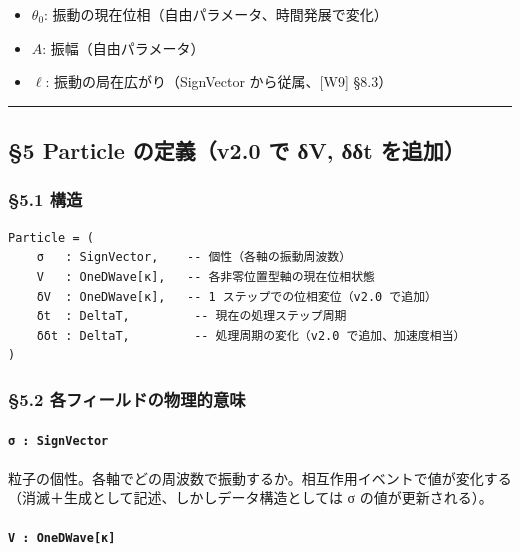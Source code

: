 \documentclass[a4paper,11pt]{ltjsarticle}
\providecommand{\tightlist}{\setlength{\itemsep}{0pt}\setlength{\parskip}{0pt}}
\begin{document}
\begin{itemize}
\tightlist
\item
  \(\theta_0\): 振動の現在位相（自由パラメータ、時間発展で変化）
\item
  \(A\): 振幅（自由パラメータ）
\item
  \(\ell\): 振動の局在広がり（SignVector から従属、{[}W9{]} §8.3）
\end{itemize}

\begin{center}\rule{0.5\linewidth}{0.5pt}\end{center}

\subsection{§5 Particle の定義（v2.0 で δV, δδt
を追加）}\label{particle-ux306eux5b9aux7fa9v2.0-ux3067-ux3b4v-ux3b4ux3b4t-ux3092ux8ffdux52a0}

\subsubsection{§5.1 構造}\label{ux69cbux9020-1}

\begin{verbatim}
Particle = (
    σ   : SignVector,    -- 個性（各軸の振動周波数）
    V   : OneDWave[κ],   -- 各非零位置型軸の現在位相状態
    δV  : OneDWave[κ],   -- 1 ステップでの位相変位（v2.0 で追加）
    δt  : DeltaT,         -- 現在の処理ステップ周期
    δδt : DeltaT,         -- 処理周期の変化（v2.0 で追加、加速度相当）
)
\end{verbatim}

\subsubsection{§5.2
各フィールドの物理的意味}\label{ux5404ux30d5ux30a3ux30fcux30ebux30c9ux306eux7269ux7406ux7684ux610fux5473}

\paragraph{\texorpdfstring{\texttt{σ\ :\ SignVector}}{σ : SignVector}}\label{ux3c3-signvector}

粒子の個性。各軸でどの周波数で振動するか。相互作用イベントで値が変化する（消滅＋生成として記述、しかしデータ構造としては
σ の値が更新される）。

\paragraph{\texorpdfstring{\texttt{V\ :\ OneDWave{[}κ{]}}}{V : OneDWave{[}κ{]}}}\label{v-onedwaveux3ba}
\end{document}
